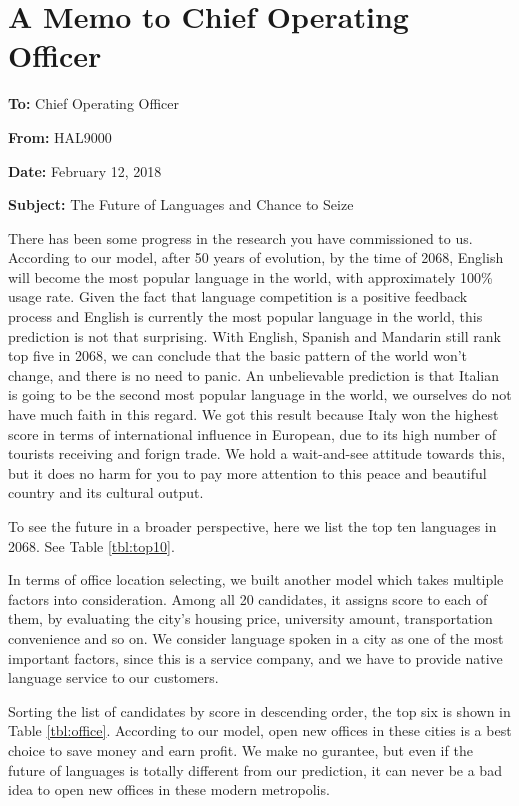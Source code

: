 \documentclass{mcmthesis}
\begin{document}
\section{A Memo to Chief Operating Officer}
\noindent\textbf{To:} Chief Operating Officer

\noindent\textbf{From:} HAL9000

\noindent\textbf{Date:} February 12, 2018

\noindent\textbf{Subject:} The Future of Languages and Chance to Seize

\noindent There has been some progress in the research you have commissioned to us. According to our model, after 50 years of evolution, by the time of 2068, English will become the most popular language in the world, with approximately 100\% usage rate. Given the fact that language competition is a positive feedback process and English is currently the most popular language in the world, this prediction is not that surprising. With English, Spanish and Mandarin still rank top five in 2068, we can conclude that the basic pattern of the world won't change, and there is no need to panic. An unbelievable prediction is that Italian is going to be the second most popular language in the world, we ourselves do not have much faith in this regard. We got this result because Italy won the highest score in terms of international influence in European, due to its high number of tourists receiving and forign trade. We hold a wait-and-see attitude towards this, but it does no harm for you to pay more attention to this peace and beautiful country and its cultural output.

To see the future in a broader perspective, here we list the top ten languages in 2068. See Table \ref{tbl:top10}.

In terms of office location selecting, we built another model which takes multiple factors into consideration. Among all 20 candidates, it assigns score to each of them, by evaluating the city's housing price, university amount, transportation convenience and so on. We consider language spoken in a city as one of the most important factors, since this is a service company, and we have to provide native language service to our customers. 

Sorting the list of candidates by score in descending order, the top six is shown in Table \ref{tbl:office}. According to our model, open new offices in these cities is a best choice to save money and earn profit. We make no gurantee, but even if the future of languages is totally different from our prediction, it can never be a bad idea to open new offices in these modern metropolis.




\end{document}
